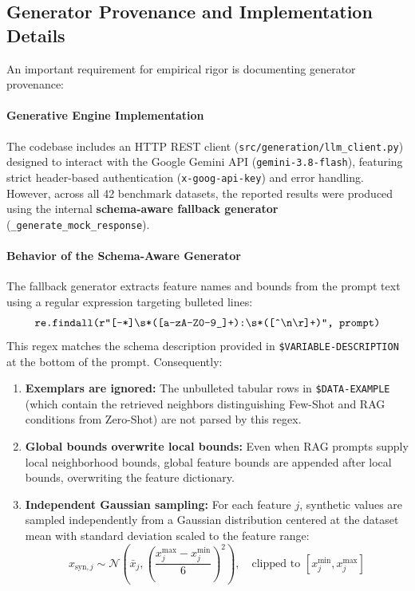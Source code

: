 \documentclass[sn-basic]{sn-jnl}
\begin{document}
\subsection{Generator Provenance and Implementation Details}
\label{subsec:generator_provenance}

An important requirement for empirical rigor is documenting generator provenance:

\paragraph{Generative Engine Implementation}
The codebase includes an HTTP REST client (\texttt{src/generation/llm\_client.py}) designed to interact with the Google Gemini API (\texttt{gemini-3.8-flash}), featuring strict header-based authentication (\texttt{x-goog-api-key}) and error handling. However, across all 42 benchmark datasets, the reported results were produced using the internal \textbf{schema-aware fallback generator} (\texttt{\_generate\_mock\_response}).

\paragraph{Behavior of the Schema-Aware Generator}
The fallback generator extracts feature names and bounds from the prompt text using a regular expression targeting bulleted lines:
\begin{equation}
\label{eq:regex}
\text{\texttt{re.findall(r"[-*]\textbackslash s*([a-zA-Z0-9\_]+):\textbackslash s*([\^{}\textbackslash n\textbackslash r]+)", prompt)}}
\end{equation}
This regex matches the schema description provided in \texttt{\$VARIABLE-DESCRIPTION} at the bottom of the prompt. Consequently:
\begin{enumerate}
    \item \textbf{Exemplars are ignored:} The unbulleted tabular rows in \texttt{\$DATA-EXAMPLE} (which contain the retrieved neighbors distinguishing Few-Shot and RAG conditions from Zero-Shot) are not parsed by this regex.
    \item \textbf{Global bounds overwrite local bounds:} Even when RAG prompts supply local neighborhood bounds, global feature bounds are appended after local bounds, overwriting the feature dictionary.
    \item \textbf{Independent Gaussian sampling:} For each feature $j$, synthetic values are sampled independently from a Gaussian distribution centered at the dataset mean with standard deviation scaled to the feature range:
    \begin{equation}
    \label{eq:mock_sampling}
    x_{\text{syn}, j} \sim \mathcal{N}\left(\bar{x}_j, \left(\frac{x_j^{\max} - x_j^{\min}}{6}\right)^2\right), \quad \text{clipped to } [x_j^{\min}, x_j^{\max}]
    \end{equation}
\end{enumerate}
\end{document}
